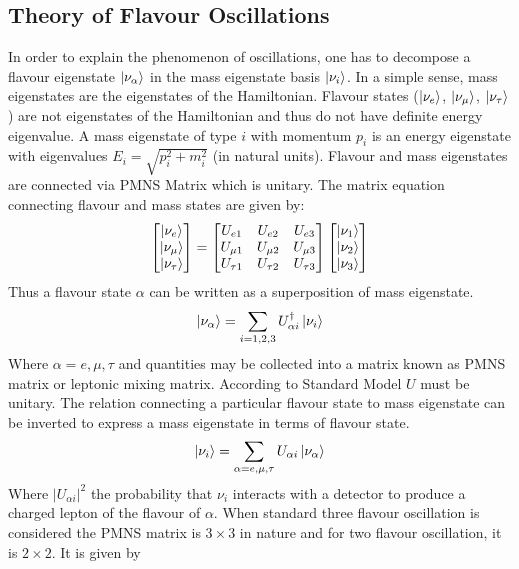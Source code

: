\documentclass[12pt,a4paper]{report}
\begin{document}
\subsection{Theory of Flavour Oscillations}
In order to explain the phenomenon of oscillations, one has to decompose a flavour eigenstate $\ket{\nu_{\alpha}}$ in the mass eigenstate basis $\ket{\nu_{i}}$. In a simple sense, mass eigenstates are the eigenstates of the Hamiltonian. Flavour states ($\ket{\nu_{e}}$, $\ket{\nu_{\mu}}$, $\ket{\nu_{\tau}}$) are not eigenstates of the Hamiltonian and thus do not have definite energy eigenvalue. A mass eigenstate of type $i$ with momentum $p_{i}$ is an energy eigenstate with eigenvalues  $E_{i}=\sqrt{p_i^{2}+m_{i}^{2}}$ (in natural units). Flavour and mass eigenstates are connected via PMNS Matrix which is unitary. The matrix equation connecting flavour and mass states are given by:
\begin{gather}
 \begin{bmatrix} \ket{\nu_{e}} \\ \ket{\nu_{\mu}} \\ \ket{\nu_{\tau}} \end{bmatrix} = 
 \begin{bmatrix} U_{e1} & U_{e2} & U_{e3} \\ U_{\mu 1} & U_{\mu 2} & U_{\mu 3}\\ U_{\tau 1} & U_{\tau 2} & U_{\tau 3}\end{bmatrix} \begin{bmatrix} \ket{\nu_{1}} \\ \ket{\nu_{2}} \\ \ket{\nu_{3}} \end{bmatrix}
\end{gather}
Thus a flavour state $\alpha$ can be written as a superposition of mass eigenstate.
\begin{equation}
\label{eq:0a}
	\ket{\nu_{\alpha}}=\sum_{i = 1,2,3} U^{\dagger} _{\alpha i}\ket{\nu_{i}}
\end{equation}
Where $\alpha = e,\mu,\tau$  and quantities  may be collected into a matrix known as PMNS matrix or leptonic mixing matrix. According to Standard Model $U$ must be unitary. The relation connecting a particular flavour state to mass eigenstate can be inverted to express a mass eigenstate in terms of flavour state.
\begin{equation}
\label{eq:0b}
\ket{\nu_{i}}=\sum_{\alpha = e,\mu,\tau} U_{\alpha i}\ket{\nu_{\alpha}}
\end{equation}
Where $|U_{\alpha i}|^{2}$ the probability that $\nu_{i}$ interacts with a detector to produce a charged lepton of the flavour of $\alpha$. When standard three flavour oscillation is considered the PMNS matrix is $3\times3$ in nature and for two flavour oscillation, it is $2\times2$. It is given by
\end{document}
